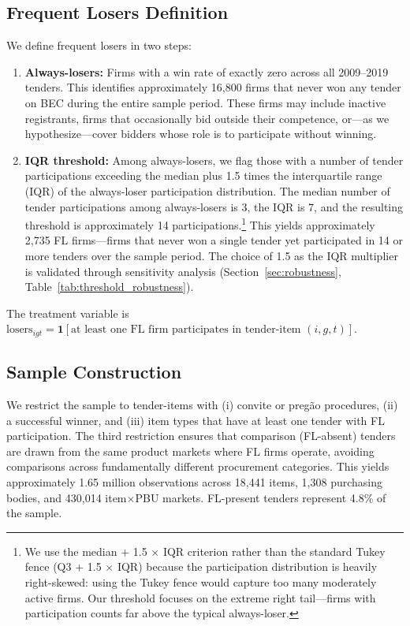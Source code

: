 \subsection{Frequent Losers Definition}

We define frequent losers in two steps:

\begin{enumerate}
\item \textbf{Always-losers:} Firms with a win rate of exactly zero across all 2009--2019 tenders. This identifies approximately 16,800 firms that never won any tender on BEC during the entire sample period. These firms may include inactive registrants, firms that occasionally bid outside their competence, or---as we hypothesize---cover bidders whose role is to participate without winning.

\item \textbf{IQR threshold:} Among always-losers, we flag those with a number of tender participations exceeding the median plus 1.5 times the interquartile range (IQR) of the always-loser participation distribution. The median number of tender participations among always-losers is 3, the IQR is 7, and the resulting threshold is approximately 14 participations.\footnote{We use the median $+$ 1.5 $\times$ IQR criterion rather than the standard Tukey fence (Q3 $+$ 1.5 $\times$ IQR) because the participation distribution is heavily right-skewed: using the Tukey fence would capture too many moderately active firms. Our threshold focuses on the extreme right tail---firms with participation counts far above the typical always-loser.} This yields approximately 2,735 FL firms---firms that never won a single tender yet participated in 14 or more tenders over the sample period. The choice of 1.5 as the IQR multiplier is validated through sensitivity analysis (Section~\ref{sec:robustness}, Table~\ref{tab:threshold_robustness}).
\end{enumerate}

The treatment variable is $\text{losers}_{igt} = \mathbf{1}[\text{at least one FL firm participates in tender-item } (i,g,t)]$.

\subsection{Sample Construction}

We restrict the sample to tender-items with (i) convite or preg\~{a}o procedures, (ii) a successful winner, and (iii) item types that have at least one tender with FL participation. The third restriction ensures that comparison (FL-absent) tenders are drawn from the same product markets where FL firms operate, avoiding comparisons across fundamentally different procurement categories. This yields approximately 1.65 million observations across 18,441 items, 1,308 purchasing bodies, and 430,014 item$\times$PBU markets. FL-present tenders represent 4.8\% of the sample.

